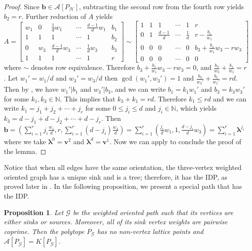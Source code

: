 \documentclass [12pt,a4paper,reqno]{amsart}
\theoremstyle{plain}
\newtheorem{Proposition}[Theorem]{Proposition}
\theoremstyle{definition}
\newtheorem{Assumptions and Discussion}[Theorem]{Assumptions and Discussion}
\theoremstyle{remark}
\newcommand\bfv{\mathbf{v}}
\newcommand\bflam{\boldsymbol{\lambda}}
\newcommand\calA{\mathcal{A}}
\newcommand\calG{\mathcal{G}}
\newcommand\calH{\mathcal{H}}
\begin{document}
\begin{proof}
Since $\mathbf{b}\in\calA[P_\calH]$, subtracting the second row from the fourth row yields $b_2=r$. Further reduction of $A$ yields
\[
A=\left[\begin{array}{ccccc|c}
w_1 & 0 & \frac{1}{d}w_1 & \cdots & \frac{d-1}{d}w_1 & b_{1}\\
1 & 1 & 1 & \cdots & 1 & b_{2}\\
0 & w_3 & \frac{d-1}{d}w_3 & \cdots & \frac{1}{d}w_3 & b_{3}\\
1 & 1 & 1 & \cdots & 1 & r
\end{array}\right]\sim
\left[\begin{array}{ccccc|c}
1 & 1 & 1 & \cdots & 1 & r\\
0 & 1 & \frac{d-1}{d} & \cdots & \frac{1}{d} & r-\frac{b_{1}}{w_1}\\
0 & 0 & 0 & \cdots & 0 & b_{3}+\frac{b_{1}}{w_1}w_3-rw_3\\
0 & 0 & 0 & \cdots & 0 & 0
\end{array}\right]
\]
 \noindent where $\sim$ denotes row equivalence. Therefore $b_{3}+\frac{b_{1}}{w_1}w_3-rw_3=0$, and $\frac{b_3}{w_3}+\frac{b_{1}}{w_1}=r$.
Let $w_1'=w_1/d$ and $w_3'=w_3/d$ then $\gcd(w_1',w_3')=1$ and $\frac{b_3}{w_3'}+\frac{b_{1}}{w_1'}=rd$. Then by , we have  $w_1'|b_{1}$ and $w_3'|b_{3}$, and we can write $b_{1}=k_{1}w_1'$ and $b_{3}=k_{3}w_3'$ for some $k_{1},k_{3}\in\mathbb{N}$. 
This implies that $k_{3}+k_{1}=rd$. Therefore $k_1\le rd$ and we can write $k_{1}=j_{1}+j_{2}+\cdots+j_{r}$
for some $0\leq j_{i}\leq d$ and $j_i\in \mathbb{N}$, which yields $k_{3}=d-j_{1}+d-j_{2}+\cdots+d-j_{r}$. 
Then $\mathbf{b}=(\sum_{i=1}^{r}j_{i}\frac{w_1}{d},r,\sum_{i=1}^{r}(d-j_{i})\frac{w_3}{d})=\sum_{i=1}^{r}(\frac{j_{i}}{d}w_1,1,\frac{d-j_{i}}{d}w_3)=\sum_{i=1}^{r}\bflam^{j_{i}}$
where we take $\bflam^{0}=\bfv^{2}$ and $\bflam^{d}=\mathbf{v}^{1}$. Now we can apply  to conclude the proof of the lemma. 
\end{proof}

Notice that when all edges have the same orientation, the three-vertex weighted oriented graph has a unique sink and is a tree; therefore, it has the IDP, as proved later in . In the following proposition, we present a special path that has the IDP.


\begin{Proposition}\label{Longgcd1}
Let $\calG$ be the weighted oriented path such that its vertices are either sinks or sources. Moreover, all of its sink vertex weights are pairwise coprime. Then the polytope $P_{\calG}$ has no non-vertex lattice points and $\calA[P_{\calG}]=K[P_{\calG}]$.
\end{Proposition}
\end{document}
